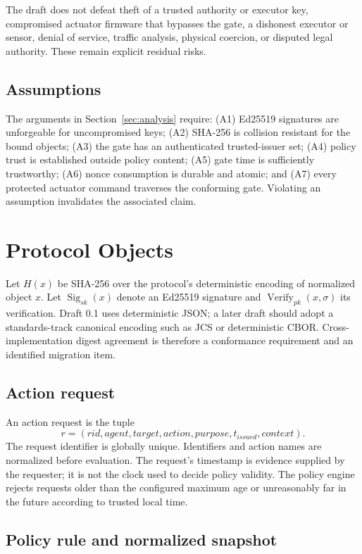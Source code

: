 \documentclass[10.5pt,a4paper]{article}
\begin{document}
The draft does not defeat theft of a trusted authority or executor key, compromised actuator
firmware that bypasses the gate, a dishonest executor or sensor, denial of service, traffic
analysis, physical coercion, or disputed legal authority. These remain explicit residual risks.

\subsection{Assumptions}

The arguments in Section~\ref{sec:analysis} require: (A1) Ed25519 signatures are unforgeable for
uncompromised keys; (A2) SHA-256 is collision resistant for the bound objects; (A3) the gate has
an authenticated trusted-issuer set; (A4) policy trust is established outside policy content;
(A5) gate time is sufficiently trustworthy; (A6) nonce consumption is durable and atomic; and
(A7) every protected actuator command traverses the conforming gate. Violating an assumption
invalidates the associated claim.

\section{Protocol Objects}

Let $H(x)$ be SHA-256 over the protocol's deterministic encoding of normalized object $x$.
Let $\operatorname{Sig}_{sk}(x)$ denote an Ed25519 signature and
$\operatorname{Verify}_{pk}(x,\sigma)$ its verification\cite{rfc8032}. Draft 0.1 uses deterministic JSON;
a later draft should adopt a standards-track canonical encoding such as JCS or deterministic
CBOR\cite{rfc8785}. Cross-implementation digest agreement is therefore a conformance requirement and an
identified migration item.

\subsection{Action request}

An action request is the tuple
\[
  r=(rid,agent,target,action,purpose,t_{issued},context).
\]
The request identifier is globally unique. Identifiers and action names are normalized before
evaluation. The request's timestamp is evidence supplied by the requester; it is not the clock
used to decide policy validity. The policy engine rejects requests older than the configured
maximum age or unreasonably far in the future according to trusted local time.

\subsection{Policy rule and normalized snapshot}
\end{document}
